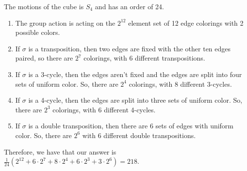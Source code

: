 \documentclass[12pt]{report}
\begin{document}
\sol The motions of the cube is $S_4$ and has an order of 24. 
\begin{enumerate}[label=\alph*.]
    \item The group action is acting on the $2^{12}$ element set of 12 edge colorings with 2 possible colors. 
    \item If $\sigma$ is a transposition, then two edges are fixed with the other ten edges paired, so there are $2^7$ colorings, with 6 different transpositions.
    \item If $\sigma$ is a 3-cycle, then the edges aren't fixed and the edges are split into four sets of uniform color. So, there are $2^4$ colorings, with 8 different 3-cycles.
    \item If $\sigma$ is a 4-cycle, then the edges are split into three sets of uniform color. So, there are $2^3$ colorings, with 6 different 4-cycles.
    \item If $\sigma$ is a double transposition, then there are 6 sets of edges with uniform color. So, there are $2^6$ with 6 different double transpositions.
\end{enumerate} 

Therefore, we have that our answer is $\frac{1}{24}(2^{12} + 6\cdot2^7 + 8\cdot 2^4 + 6\cdot 2^3+ 3\cdot 2^6) = 218$.
\end{document}
